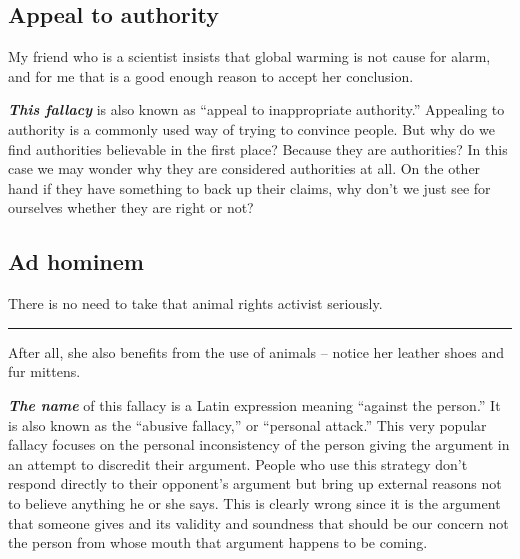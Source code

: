 \documentclass[]{book}
\makeatletter
\newenvironment{kframe}{%
\medskip{}
\setlength{\fboxsep}{.8em}
 \def\at@end@of@kframe{}%
 \ifinner\ifhmode%
  \def\at@end@of@kframe{\end{minipage}}%
  \begin{minipage}{\columnwidth}%
 \fi\fi%
 \def\FrameCommand##1{\hskip\@totalleftmargin \hskip-\fboxsep
 \colorbox{shadecolor}{##1}\hskip-\fboxsep
     \hskip-\linewidth \hskip-\@totalleftmargin \hskip\columnwidth}%
 \MakeFramed {\advance\hsize-\width
   \@totalleftmargin\z@ \linewidth\hsize
   \@setminipage}}%
 {\par\unskip\endMakeFramed%
 \at@end@of@kframe}
\newenvironment{rmdblock}[1]
  {
  \begin{itemize}
  \renewcommand{\labelitemi}{
    \raisebox{-.7\height}[0pt][0pt]{
      {\setkeys{Gin}{width=3em,keepaspectratio}\texttt{[image: img/\#1]}}
    }
  }
  \setlength{\fboxsep}{1em}
  \begin{kframe}
  \item
  }
  {
  \end{kframe}
  \end{itemize}
  }
\newenvironment{rmdwarning}
  {\begin{rmdblock}{warning}}
  {\end{rmdblock}}
\makeatother
\begin{document}
\hypertarget{appeal-to-authority}{%
\subsection*{Appeal to authority}\label{appeal-to-authority}}


\begin{rmdwarning}
My friend who is a scientist insists that global warming is not cause
for alarm, and for me that is a good enough reason to accept her
conclusion.
\end{rmdwarning}

\textbf{\emph{This fallacy}} is also known as ``appeal to inappropriate authority.'' Appealing to authority is a commonly used way of trying to convince people. But why do we find authorities believable in the first place? Because they are authorities? In this case we may wonder why they are considered authorities at all. On the other hand if they have something to back up their claims, why don't we just see for ourselves whether they are right or not?

\hypertarget{ad-hominem}{%
\subsection*{Ad hominem}\label{ad-hominem}}


\begin{rmdwarning}
There is no need to take that animal rights activist seriously.

\begin{center}\rule{0.5\linewidth}{\linethickness}\end{center}

After all, she also benefits from the use of animals -- notice her
leather shoes and fur mittens.
\end{rmdwarning}

\textbf{\emph{The name}} of this fallacy is a Latin expression meaning ``against the person.'' It is also known as the ``abusive fallacy,'' or ``personal attack.'' This very popular fallacy focuses on the personal inconsistency of the person giving the argument in an attempt to discredit their argument. People who use this strategy don't respond directly to their opponent's argument but bring up external reasons not to believe anything he or she says. This is clearly wrong since it is the argument that someone gives and its validity and soundness that should be our concern not the person from whose mouth that argument happens to be coming.
\end{document}
